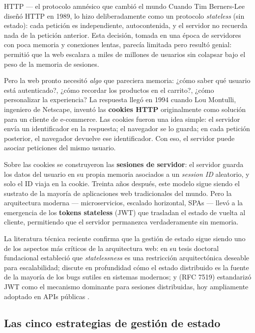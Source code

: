 \begin{cajahistoria}{HTTP --- el protocolo amnésico que cambió el mundo}
Cuando Tim Berners-Lee diseñó HTTP en 1989, lo hizo deliberadamente
como un protocolo \emph{stateless} (sin estado): cada petición es
independiente, autocontenida, y el servidor no recuerda nada de la
petición anterior. Esta decisión, tomada en una época de servidores
con poca memoria y conexiones lentas, parecía limitada pero resultó
genial: permitió que la web escalara a miles de millones de usuarios
sin colapsar bajo el peso de la memoria de sesiones.

Pero la web pronto necesitó \emph{algo} que pareciera memoria: ¿cómo
saber qué usuario está autenticado?, ¿cómo recordar los productos en
el carrito?, ¿cómo personalizar la experiencia? La respuesta llegó en
1994 cuando Lou Montulli, ingeniero de Netscape, inventó las
\textbf{cookies HTTP} originalmente como solución para un cliente de
e-commerce. Las cookies fueron una idea simple: el servidor envía un
identificador en la respuesta; el navegador se lo guarda; en cada
petición posterior, el navegador devuelve ese identificador. Con eso,
el servidor puede asociar peticiones del mismo usuario.

Sobre las cookies se construyeron las \textbf{sesiones de servidor}:
el servidor guarda los datos del usuario en su propia memoria
asociados a un \emph{session ID} aleatorio, y solo el ID viaja en la
cookie. Treinta años después, este modelo sigue siendo el sustrato de
la mayoría de aplicaciones web tradicionales del mundo. Pero la
arquitectura moderna --- microservicios, escalado horizontal, SPAs
--- llevó a la emergencia de los \textbf{tokens stateless} (JWT) que
trasladan el estado de vuelta al cliente, permitiendo que el servidor
permanezca verdaderamente sin memoria.

La literatura técnica reciente confirma que la gestión de estado sigue
siendo uno de los aspectos más críticos de la arquitectura web:
\cite{fielding2000rest} en su tesis doctoral fundacional estableció
que \emph{statelessness} es una restricción arquitectónica deseable
para escalabilidad; \cite{kleppmann2017designing} discute en
profundidad cómo el estado distribuido es la fuente de la mayoría de
los bugs sutiles en sistemas modernos; y
\cite{jones2015jwt} (RFC 7519) estandarizó JWT como el mecanismo
dominante para sesiones distribuidas, hoy ampliamente adoptado en
APIs públicas \cite{jones2015jwt}.
\end{cajahistoria}

\subsection{Las cinco estrategias de gestión de estado}

